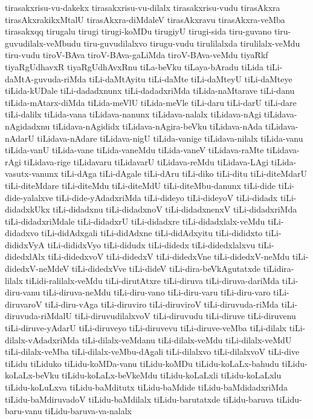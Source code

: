 {tirasakxrisu-vu-dakekx
tirasakxrisu-vu-dilalx
tirasakxrisu-vudu
tirasAkxra
tirasAkxrakikxMtalU
tirasAkxra-diMdaleV
tirasAkxravu
tirasAkxra-veMba
tirasakxqq
tirugalu
tirugi
tirugi-koMDu
tirugiyU
tirugi-sida
tiru-guvano
tiru-guvudilalx-veMbudu
tiru-guvudilalxvo
tirugu-vudu
tirulilalxda
tirulilalx-veMdu
tiru-vudu
tiroV-BAva
tiroV-BAva-gaLiMda
tiroV-BAva-veMdu
tiyaRkf
tiyaRgUdhavxR
tiyaRgUdhAvxRnu
tiLa-beVku
tiLaya-bAradu
tiLida
tiLi-daMtA-guvuda-riMda
tiLi-daMtAyitu
tiLi-daMte
tiLi-daMteyU
tiLi-daMteye
tiLida-kUDale
tiLi-dadadxnunx
tiLi-dadadxriMda
tiLida-naMtarave
tiLi-danu
tiLida-mAtarx-diMda
tiLida-meVlU
tiLida-meVle
tiLi-daru
tiLi-darU
tiLi-dare
tiLi-dalilx
tiLida-vana
tiLidava-nanunx
tiLidava-nalalx
tiLidava-nAgi
tiLidava-nAgidadxnu
tiLidava-nAgididx
tiLidava-nAgira-beVku
tiLidava-nAda
tiLidava-nAdarU
tiLidava-nAdare
tiLidava-nigU
tiLida-vanige
tiLidava-nilalx
tiLida-vanu
tiLida-vanU
tiLida-vane
tiLida-vaneMdu
tiLida-vaneV
tiLidava-raMte
tiLidava-rAgi
tiLidava-rige
tiLidavaru
tiLidavarU
tiLidava-reMdu
tiLidava-LAgi
tiLida-vasutx-vanunx
tiLi-dAga
tiLi-dAgale
tiLi-dAru
tiLi-diko
tiLi-ditu
tiLi-diteMdarU
tiLi-diteMdare
tiLi-diteMdu
tiLi-diteMdU
tiLi-diteMbu-danunx
tiLi-dide
tiLi-dide-yalalxve
tiLi-dide-yAdadxriMda
tiLi-dideyo
tiLi-dideyoV
tiLi-didadx
tiLi-didadxkUkx
tiLi-didadxnu
tiLi-didadxnoV
tiLi-didadxnenxV
tiLi-didadxriMda
tiLi-didadxriMdale
tiLi-didadxrU
tiLi-didadxre
tiLi-didadxlalx-veMdu
tiLi-didadxvo
tiLi-didAdxgali
tiLi-didAdxne
tiLi-didAdxyitu
tiLi-dididxto
tiLi-dididxVyA
tiLi-dididxVyo
tiLi-didudx
tiLi-didedx
tiLi-didedxlalxvu
tiLi-didedxlAlx
tiLi-didedxvoV
tiLi-didedxV
tiLi-didedxVne
tiLi-didedxV-neMdu
tiLi-didedxV-neMdeV
tiLi-didedxVve
tiLi-dideV
tiLi-dira-beVkAgutatxde
tiLidira-lilalx
tiLidi-ralilalx-veMdu
tiLi-dirutAtxre
tiLi-diruva
tiLi-diruva-dariMda
tiLi-diru-vanu
tiLi-diruva-neMdu
tiLi-diru-vano
tiLi-diru-varu
tiLi-diru-varo
tiLi-diruvaroV
tiLi-diru-vAga
tiLi-diruviro
tiLi-diruviroV
tiLi-diruvuda-riMda
tiLi-diruvuda-riMdalU
tiLi-diruvudilalxvoV
tiLi-diruvudu
tiLi-diruve
tiLi-diruvenu
tiLi-diruve-yAdarU
tiLi-diruveyo
tiLi-diruvevu
tiLi-diruve-veMba
tiLi-dilalx
tiLi-dilalx-vAdadxriMda
tiLi-dilalx-veMdanu
tiLi-dilalx-veMdu
tiLi-dilalx-veMdU
tiLi-dilalx-veMba
tiLi-dilalx-veMbu-dAgali
tiLi-dilalxvo
tiLi-dilalxvoV
tiLi-dive
tiLidu
tiLiduko
tiLidu-koMDa-vanu
tiLidu-koMDu
tiLidu-koLaLx-bahudu
tiLidu-koLaLx-beVku
tiLidu-koLaLx-beVkeMdu
tiLidu-koLaLxli
tiLidu-koLaLxlu
tiLidu-koLuLxva
tiLidu-baMditutx
tiLidu-baMdide
tiLidu-baMdidadxriMda
tiLidu-baMdiruvadoV
tiLidu-baMdilalx
tiLidu-barutatxde
tiLidu-baruva
tiLidu-baru-vanu
tiLidu-baruva-va-nalalx
}
